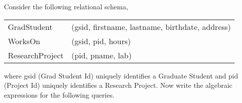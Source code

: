 



\question Consider the following relational schema,\\
\begin{tabular}{ll}
  GradStudent     &(gsid, firstname, lastname, birthdate, address) \\
  WorksOn         &(gsid, pid, hours) \\
  ResearchProject &(pid, pname, lab)
\end{tabular}
where gsid (Grad Student Id) uniquely identifies a Graduate Student and
pid (Project Id) uniquely identifies a Research Project. Now write the 
algebraic expressions for the following queries.

